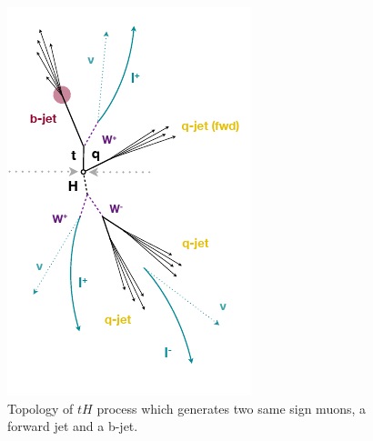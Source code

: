 	\begin{figure}[ht]
		\centering
		\includegraphics[scale=1]{Chapter1/jet.png}
		\caption[Topology of $tH$]{Topology of $tH$ process which generates two same sign muons, a forward jet and a b-jet.} 
		\label{jet}
	\end{figure}
